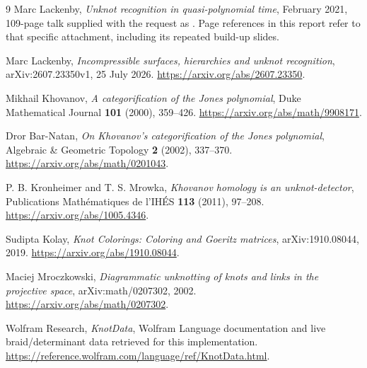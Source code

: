 \documentclass[11pt]{article}
\theoremstyle{remark}\newtheorem{remark}[theorem]{Remark}
\newcommand{\code}[1]{\texttt{\detokenize{#1}}}
\begin{document}
\begin{thebibliography}{9}
Marc Lackenby, \emph{Unknot recognition in quasi-polynomial time}, February
2021, 109-page talk supplied with the request as
\code{quasipolynomial-talk.pdf}. Page references in this report refer to that
specific attachment, including its repeated build-up slides.

Marc Lackenby, \emph{Incompressible surfaces, hierarchies and unknot
recognition}, arXiv:2607.23350v1, 25 July 2026.
\url{https://arxiv.org/abs/2607.23350}.

Mikhail Khovanov, \emph{A categorification of the Jones polynomial}, Duke
Mathematical Journal \textbf{101} (2000), 359--426.
\url{https://arxiv.org/abs/math/9908171}.

Dror Bar-Natan, \emph{On Khovanov's categorification of the Jones polynomial},
Algebraic \& Geometric Topology \textbf{2} (2002), 337--370.
\url{https://arxiv.org/abs/math/0201043}.

P. B. Kronheimer and T. S. Mrowka, \emph{Khovanov homology is an unknot-detector},
Publications Math\'ematiques de l'IH\'ES \textbf{113} (2011), 97--208.
\url{https://arxiv.org/abs/1005.4346}.

Sudipta Kolay, \emph{Knot Colorings: Coloring and Goeritz matrices},
arXiv:1910.08044, 2019. \url{https://arxiv.org/abs/1910.08044}.

Maciej Mroczkowski, \emph{Diagrammatic unknotting of knots and links in the
projective space}, arXiv:math/0207302, 2002.
\url{https://arxiv.org/abs/math/0207302}.

Wolfram Research, \emph{KnotData}, Wolfram Language documentation and live
braid/determinant data retrieved for this implementation.
\url{https://reference.wolfram.com/language/ref/KnotData.html}.
\end{thebibliography}
\end{document}
